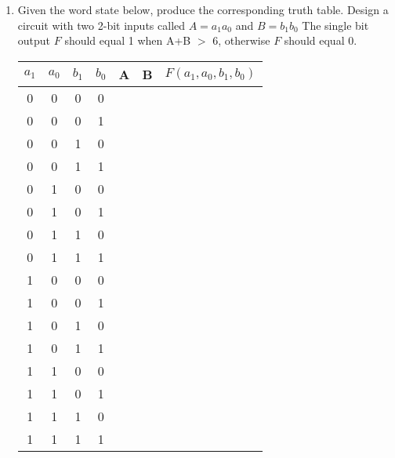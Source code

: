 \begin{enumerate}
    \item Given the word state below, produce the corresponding truth table.
        Design a circuit with two 2-bit inputs called $A = a_1 a_0$ and  $B = b_1 b_0$
        The single bit output $F$ should equal 1 when A+B $>$ 6, otherwise $F$
        should equal 0.

        \begin{tabular}{c|c|c|c||c|c||c}
            $a_1$ & $a_0$ & $b_1$ & $b_0$ & A  & B & $F(a_1, a_0, b_1, b_0)$     \\ \hline
            0 & 0 & 0 & 0 &  &  &   \\ \hline
            0 & 0 & 0 & 1 &  &  &   \\ \hline
            0 & 0 & 1 & 0 &  &  &   \\ \hline
            0 & 0 & 1 & 1 &  &  &   \\ \hline
            0 & 1 & 0 & 0 &  &  &   \\ \hline
            0 & 1 & 0 & 1 &  &  &   \\ \hline
            0 & 1 & 1 & 0 &  &  &   \\ \hline
            0 & 1 & 1 & 1 &  &  &   \\ \hline
            1 & 0 & 0 & 0 &  &  &   \\ \hline
            1 & 0 & 0 & 1 &  &  &   \\ \hline
            1 & 0 & 1 & 0 &  &  &   \\ \hline
            1 & 0 & 1 & 1 &  &  &   \\ \hline
            1 & 1 & 0 & 0 &  &  &   \\ \hline
            1 & 1 & 0 & 1 &  &  &   \\ \hline
            1 & 1 & 1 & 0 &  &  &   \\ \hline
            1 & 1 & 1 & 1 &  &  &   \\
        \end{tabular}

\end{enumerate}
